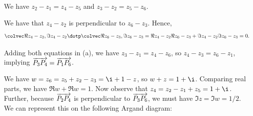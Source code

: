 \begin{solution}
    \begin{ppart}
        We have $z_2 - z_1 = z_4 - z_5$ and $z_3 - z_2 = z_5 - z_6$.
    \end{ppart}
    \begin{ppart}
        We have that $z_4 - z_2$ is perpendicular to $z_6 - z_3$. Hence, \[\cvecii{\Re{z_4 - z_2}}{\Im{z_4 - z_2}} \dotp \cvecii{\Re{z_6 - z_3}}{\Im{z_6 - z_3}} = \Re{z_4 - z_2}\Re{z_6 - z_3} + \Im{z_4 - z_2}\Im{z_6 - z_3} = 0.\]
    \end{ppart}
    \begin{ppart}
        Adding both equations in (a), we have $z_3 - z_1 = z_4 - z_6$, so $z_4 - z_3 = z_6 - z_1$, implying $\overrightarrow{P_3 P_4} = \overrightarrow{P_1 P_6}$.
    \end{ppart}
    \begin{ppart}
        We have $w = z_6 = z_5 + z_2 - z_3 = \i + 1 - z$, so $w+z = 1 + \i$. Comparing real parts, we have $\Re{w} + \Re{w} = 1$. Now observe that $z_4 = z_2 - z_1 + z_5 = 1 + \i$. Further, because $\overrightarrow{P_2 P_4}$ is perpendicular to $\overrightarrow{P_3 P_6}$, we must have $\Im{z} = \Im{w} = 1/2$. We can represent this on the following Argand diagram:

        \begin{center}
\end{center}
\end{ppart}
\end{solution}
